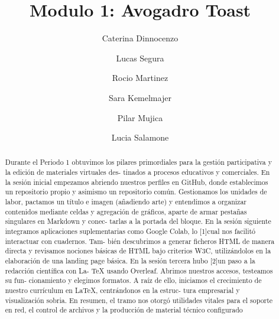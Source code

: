 \documentclass[runningheads]{llncs}
\begin{document}
%
\title{Modulo 1: Avogadro Toast}
%
%
\author{Caterina Dinnocenzo \and
Lucas Segura \and
Rocio Martinez\and
Sara Kemelmajer\and
Pilar Mujica\and
Lucia Salamone}
%
%
%
\maketitle              %
%
\begin{abstract}
Durante el Periodo 1 obtuvimos los pilares primordiales
para la gestión participativa y la edición de materiales virtuales des-
tinados a procesos educativos y comerciales. En la sesión inicial
empezamos abriendo nuestros perfiles en GitHub, donde establecimos
un repositorio propio y asimismo un repositorio común. Gestionamos los
unidades de labor, pactamos un título e imagen (añadiendo arte)
y entendimos a organizar contenidos mediante celdas y agregación de
gráficos, aparte de armar pestañas singulares en Markdown y conec-
tarlas a la portada del bloque.
En la sesión siguiente integramos aplicaciones suplementarias como
Google Colab, lo [1]cual nos facilitó interactuar con cuadernos. Tam-
bién descubrimos a generar ficheros HTML de manera directa y revisamos
nociones básicas de HTML bajo criterios W3C, utilizándolos en
la elaboración de una landing page básica.
En la sesión tercera hubo [2]un paso a la redacción científica con La-
TeX usando Overleaf. Abrimos nuestros accesos, testeamos su fun-
cionamiento y elegimos formatos. A raíz de ello, iniciamos el
crecimiento de nuestro currículum en LaTeX, centrándonos en la estruc-
tura empresarial y visualización sobria.
En resumen, el tramo nos otorgó utilidades vitales para el soporte en
red, el control de archivos y la producción de material técnico
configurado


\end{abstract}
%
%
%
\end{document}
